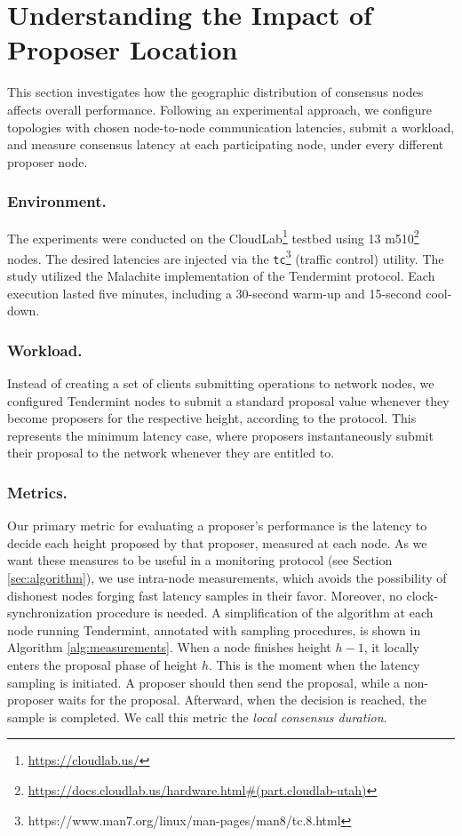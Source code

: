 \section{Understanding the Impact of Proposer Location}
\label{sec:impact}

This section investigates how the geographic distribution of consensus nodes affects overall performance.
Following an experimental approach, we configure topologies with chosen node-to-node communication latencies,
submit a workload, and measure consensus latency at each participating node, under every different proposer node.

\subsubsection{Environment.}

The experiments were conducted on the CloudLab\footnote{\url{https://cloudlab.us/}} testbed using 13 m510\footnote{\url{https://docs.cloudlab.us/hardware.html\#(part.cloudlab-utah)}} nodes.
The desired latencies are injected via the \texttt{tc}\footnote{https://www.man7.org/linux/man-pages/man8/tc.8.html} (traffic control) utility. 
The study utilized the Malachite implementation of the Tendermint protocol. Each execution lasted five minutes, including a 30-second warm-up and 15-second cool-down.

\subsubsection{Workload.}

Instead of creating a set of clients submitting operations to network nodes, we configured Tendermint nodes to submit a standard proposal value whenever  
they become proposers for the respective height, according to the protocol. This represents the minimum latency case, where proposers instantaneously 
submit their proposal to the network whenever they are entitled to.


\subsubsection{Metrics.}

Our primary metric for evaluating a proposer's performance is the latency to decide each height proposed by that proposer, measured at each node.
As we want these measures to be useful in a monitoring protocol (see Section \ref{sec:algorithm}), we use intra-node measurements, which avoids the possibility of dishonest nodes forging fast latency samples in their favor.
Moreover, no clock-synchronization procedure is needed. A simplification of the algorithm at each node running Tendermint, annotated with sampling procedures, is shown in Algorithm \ref{alg:measurements}. 
When a node finishes height $h-1$, it locally enters the proposal phase of height $h$.
This is the moment when the latency sampling is initiated.
A proposer should then send the proposal, while a non-proposer waits for the proposal.  Afterward, when the decision is reached, the sample is completed.
We call this metric the {\it local consensus duration}.


